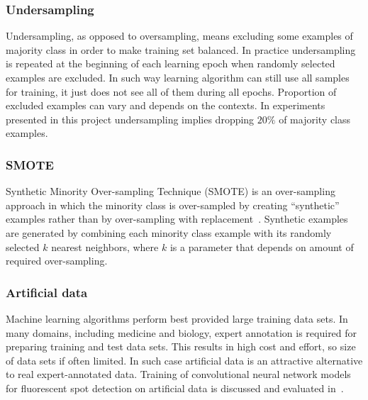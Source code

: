 \documentclass[a4paper, 11pt, table]{article}
\begin{document}
\subsubsection{Undersampling}
Undersampling, as opposed to oversampling, means excluding some examples of majority class in order to make training set balanced. In practice undersampling is repeated at the beginning of each learning epoch when randomly selected examples are excluded. In such way learning algorithm can still use all samples for training, it just does not see all of them during all epochs. Proportion of excluded examples can vary and depends on the contexts. In experiments presented in this project undersampling implies dropping $20\%$ of majority class examples. 

\subsubsection{SMOTE}
Synthetic Minority Over-sampling Technique (SMOTE) is an over-sampling approach in which the minority class is over-sampled by creating “synthetic” examples rather than by over-sampling with replacement~\cite{smote_chawla}. 
Synthetic examples are generated by combining each minority class example with its randomly selected $k$ nearest neighbors, where $k$ is a parameter that depends on amount of required over-sampling.

\subsubsection{Artificial data}
Machine learning algorithms perform best provided large training data sets. In many domains, including medicine and biology, expert annotation is required for preparing training and test data sets. This results in high cost and effort, so size of data sets if often limited. In such case artificial data is an attractive alternative to real expert-annotated data. Training of convolutional neural network models for fluorescent spot detection on artificial data is discussed and evaluated in~\cite{ishaq_synthetic}. 
\end{document}
